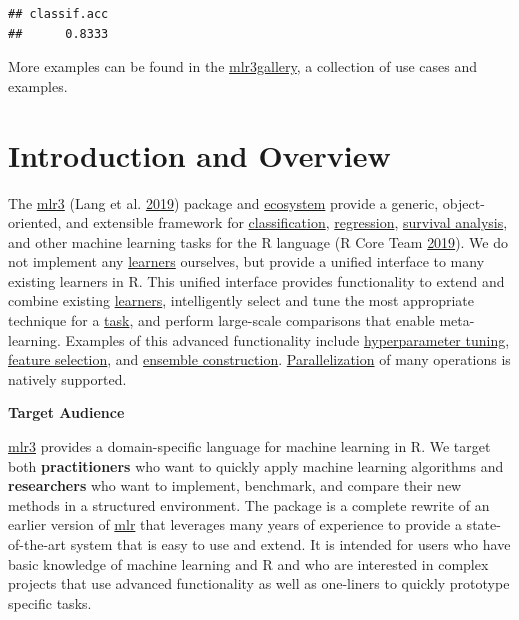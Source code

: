 \documentclass[]{article}
\begin{document}
\begin{verbatim}
## classif.acc 
##      0.8333
\end{verbatim}

More examples can be found in the \href{https://mlr3gallery.mlr-org.com}{mlr3gallery}, a collection of use cases and examples.

\hypertarget{introduction-and-overview}{%
\section{Introduction and Overview}\label{introduction-and-overview}}

The \href{https://mlr3.mlr-org.com}{mlr3} (Lang et al. \protect\hyperlink{ref-mlr3}{2019}) package and \href{https://github.com/mlr-org/mlr3/wiki/Extension-Packages}{ecosystem} provide a generic, object-oriented, and extensible framework for \protect\hyperlink{tasks}{classification}, \protect\hyperlink{tasks}{regression}, \protect\hyperlink{survival}{survival analysis}, and other machine learning tasks for the R language (R Core Team \protect\hyperlink{ref-R}{2019}).
We do not implement any \protect\hyperlink{learners}{learners} ourselves, but provide a unified interface to many existing learners in R.
This unified interface provides functionality to extend and combine existing \protect\hyperlink{learners}{learners}, intelligently select and tune the most appropriate technique for a \protect\hyperlink{tasks}{task}, and perform large-scale comparisons that enable meta-learning.
Examples of this advanced functionality include \protect\hyperlink{tuning}{hyperparameter tuning}, \protect\hyperlink{fs}{feature selection}, and \protect\hyperlink{fs-ensemble}{ensemble construction}. \protect\hyperlink{parallelization}{Parallelization} of many operations is natively supported.

\textbf{Target Audience}

\href{https://mlr3.mlr-org.com}{mlr3} provides a domain-specific language for machine learning in R.
We target both \textbf{practitioners} who want to quickly apply machine learning algorithms and \textbf{researchers} who want to implement, benchmark, and compare their new methods in a structured environment.
The package is a complete rewrite of an earlier version of \href{https://mlr.mlr-org.com}{mlr} that leverages many years of experience to provide a state-of-the-art system that is easy to use and extend.
It is intended for users who have basic knowledge of machine learning and R and who are interested in complex projects that use advanced functionality as well as one-liners to quickly prototype specific tasks.
\end{document}
